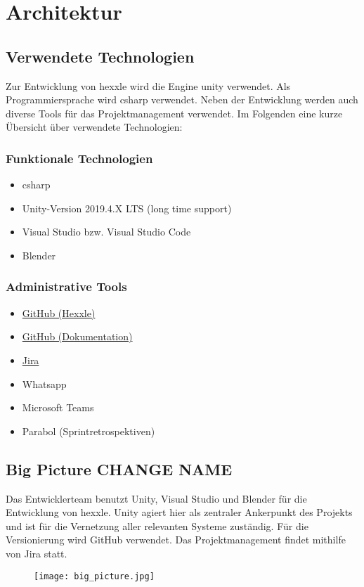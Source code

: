 \documentclass[../main.tex]{subfiles}
\begin{document}
	\section{Architektur}
	\subsection{Verwendete Technologien}
	\par Zur Entwicklung von \gls{hexxle} wird die Engine \gls{unity} verwendet. Als Programmiersprache wird \gls{csharp} verwendet. Neben der Entwicklung werden auch diverse Tools für das Projektmanagement verwendet. Im Folgenden eine kurze Übersicht über verwendete Technologien:

	\subsubsection{Funktionale Technologien}
	\begin{itemize}
		\item \gls{csharp}
		\item Unity-Version 2019.4.X LTS (long time support)
		\item Visual Studio bzw. Visual Studio Code
		\item Blender
	\end{itemize}
	\subsubsection{Administrative Tools}
	\begin{itemize}
		\item \href{https://github.com/hexxler/hexxle_game}{GitHub (Hexxle)}
		\item \href{https://github.com/hexxler/documentation}{GitHub (Dokumentation)}
		\item \href{https://hexxle.atlassian.net/jira/software/projects/HEXXLE/boards/1}{Jira}
		\item Whatsapp
		\item Microsoft Teams
		\item Parabol (Sprintretrospektiven)
	\end{itemize}

	\subsection{Big Picture CHANGE NAME}
	\par Das Entwicklerteam benutzt Unity, Visual Studio und Blender für die Entwicklung von \gls{hexxle}. Unity agiert hier als zentraler Ankerpunkt des Projekts und ist für die Vernetzung aller relevanten Systeme zuständig. Für die Versionierung wird GitHub verwendet. Das Projektmanagement findet mithilfe von Jira statt.
	\begin{figure}[H]
	\centering
	\texttt{[image: big\_picture.jpg]}
	\end{figure}
\end{document}
